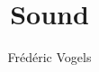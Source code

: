 \usepackage{ucll-code}
\usetikzlibrary{shadows,shapes.multipart}

\title{Sound}
\author{Fr\'ed\'eric Vogels}

\newcommand{\csharp}{C$^\sharp$}



\begin{frame}
  \titlepage
\end{frame}







